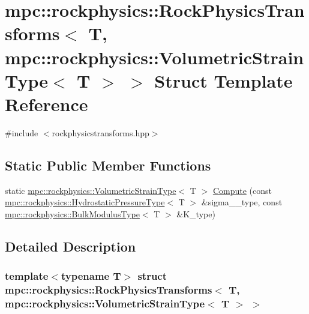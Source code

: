 \hypertarget{structmpc_1_1rockphysics_1_1_rock_physics_transforms_3_01_t_00_01mpc_1_1rockphysics_1_1_volumetric_strain_type_3_01_t_01_4_01_4}{}\section{mpc\+:\+:rockphysics\+:\+:Rock\+Physics\+Transforms$<$ T, mpc\+:\+:rockphysics\+:\+:Volumetric\+Strain\+Type$<$ T $>$ $>$ Struct Template Reference}
\label{structmpc_1_1rockphysics_1_1_rock_physics_transforms_3_01_t_00_01mpc_1_1rockphysics_1_1_volumetric_strain_type_3_01_t_01_4_01_4}


{\ttfamily \#include $<$rockphysicstransforms.\+hpp$>$}

\subsection*{Static Public Member Functions}
\begin{DoxyCompactItemize}
\item 
static \mbox{\hyperlink{structmpc_1_1rockphysics_1_1_volumetric_strain_type}{mpc\+::rockphysics\+::\+Volumetric\+Strain\+Type}}$<$ T $>$ \mbox{\hyperlink{structmpc_1_1rockphysics_1_1_rock_physics_transforms_3_01_t_00_01mpc_1_1rockphysics_1_1_volumetric_strain_type_3_01_t_01_4_01_4_aab8c94dcc7523c64c2985dacf02bd160}{Compute}} (const \mbox{\hyperlink{structmpc_1_1rockphysics_1_1_hydrostatic_pressure_type}{mpc\+::rockphysics\+::\+Hydrostatic\+Pressure\+Type}}$<$ T $>$ \&sigma\+\_\+\_\+type, const \mbox{\hyperlink{structmpc_1_1rockphysics_1_1_bulk_modulus_type}{mpc\+::rockphysics\+::\+Bulk\+Modulus\+Type}}$<$ T $>$ \&K\+\_\+type)
\end{DoxyCompactItemize}


\subsection{Detailed Description}
\subsubsection*{template$<$typename T$>$\newline
struct mpc\+::rockphysics\+::\+Rock\+Physics\+Transforms$<$ T, mpc\+::rockphysics\+::\+Volumetric\+Strain\+Type$<$ T $>$ $>$}



